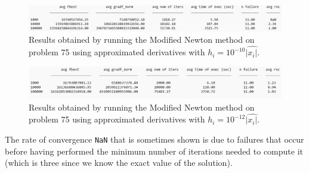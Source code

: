 \begin{figure}[H]
    \centering
    \includegraphics[width=1\textwidth]{img/pb75_table_MN_REL_10.png}
    \caption{Results obtained by running the Modified Newton method on problem 75 using approximated derivatives with $h_i=10^{-10}|\hat{x_i|}$.} 
\end{figure}

\begin{figure}[H]
    \centering
    \includegraphics[width=1\textwidth]{img/pb75_table_MN_REL_12.png}
    \caption{Results obtained by running the Modified Newton method on problem 75 using approximated derivatives with $h_i=10^{-12}|\hat{x_i|}$.} 
\end{figure}

The rate of convergence \texttt{NaN} that is sometimes shown is due to failures that occur before having performed the minimum number of iterations 
needed to compute it (which is three since we know the exact value of the solution).

